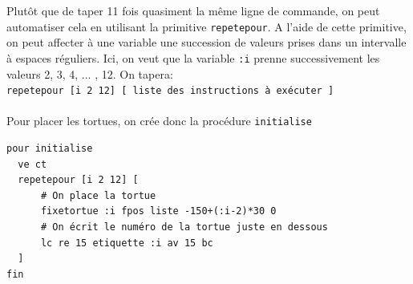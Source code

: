 Plutôt que de taper 11 fois quasiment la même ligne de commande, on peut automatiser cela en utilisant la primitive \texttt{repetepour}. A l'aide de cette primitive, on peut affecter à une variable une succession de valeurs prises dans un intervalle à espaces réguliers. Ici, on veut que la variable \texttt{:i} prenne successivement les valeurs 2, 3, 4, ... , 12. On tapera:\\
\texttt{repetepour [i 2 12] [ liste des instructions à exécuter ]}\\ \\
Pour placer les tortues, on crée donc la procédure \texttt{initialise}
\begin{verbatim}
pour initialise
  ve ct
  repetepour [i 2 12] [ 
      # On place la tortue
      fixetortue :i fpos liste -150+(:i-2)*30 0
      # On écrit le numéro de la tortue juste en dessous 
      lc re 15 etiquette :i av 15 bc 
  ]
fin
\end{verbatim}

